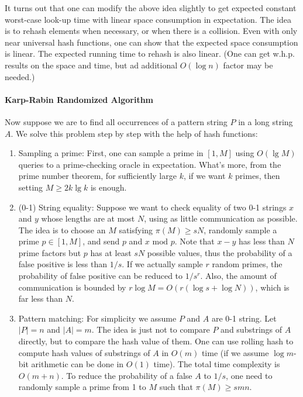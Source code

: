 \documentclass[openany]{book}
\begin{document}
It turns out that one can modify the above idea slightly to get expected constant worst-case look-up time with linear space consumption in expectation. The idea is to rehash elements when necessary, or when there is a collision. Even with only near universal hash functions, one can show that the expected space consumption is linear. The expected running time to rehash is also linear. (One can get w.h.p. results on the space and time, but ad additional $O(\log n)$ factor may be needed.)

\paragraph{Karp-Rabin Randomized Algorithm}
Now suppose we are to find all occurrences of a pattern string $P$ in a long string $A$. We solve this problem step by step with the help of hash functions:
\begin{enumerate}
\item Sampling a prime: First, one can sample a prime in $[1,M]$ using $O(\lg M)$ queries to a prime-checking oracle in expectation. What's more, from the prime number theorem, for sufficiently large $k$, if we want $k$ primes, then setting $M\ge2k\lg k$ is enough.

\item (0-1) String equality: Suppose we want to check equality of two 0-1 strings $x$ and $y$ whose lengths are at most $N$, using as little communication as possible. The idea is to choose an $M$ satisfying $\pi(M)\ge sN$, randomly sample a prime $p\in[1,M]$, and send $p$ and $x\textrm{ mod }p$. Note that $x-y$ has less than $N$ prime factors but $p$ has at least $sN$ possible values, thus the probability of a false positive is less than $1/s$. If we actually sample $r$ random primes, the probability of false positive can be reduced to $1/s^r$. Also, the amount of communication is bounded by $r\log M=O(r(\log s+\log N))$, which is far less than $N$.

\item Pattern matching: For simplicity we assume $P$ and $A$ are 0-1 string. Let $|P|=n$ and $|A|=m$. The idea is just not to compare $P$ and substrings of $A$ directly, but to compare the hash value of them. One can use rolling hash to compute hash values of substrings of $A$ in $O(m)$ time (if we assume $\log m$-bit arithmetic can be done in $O(1)$ time). The total time complexity is $O(m+n)$. To reduce the probability of a false $A$ to $1/s$, one need to randomly sample a prime from 1 to $M$ such that $\pi(M)\ge smn$.
\end{enumerate}
\end{document}
